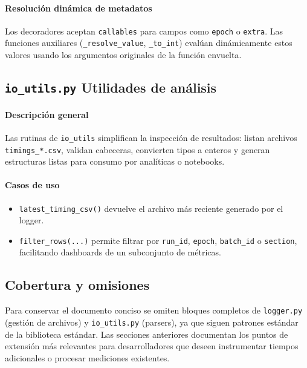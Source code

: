 \paragraph{Resolución dinámica de metadatos}
Los decoradores aceptan \texttt{callables} para campos como \texttt{epoch} o \texttt{extra}. Las funciones auxiliares (\texttt{\_resolve\_value}, \texttt{\_to\_int}) evalúan dinámicamente estos valores usando los argumentos originales de la función envuelta.

\subsection{\texttt{io\_utils.py} \- Utilidades de análisis}
\paragraph{Descripción general}
Las rutinas de \texttt{io\_utils} simplifican la inspección de resultados: listan archivos \texttt{timings\_*.csv}, validan cabeceras, convierten tipos a enteros y generan estructuras listas para consumo por analíticas o notebooks.

\paragraph{Casos de uso}
\begin{itemize}
    \item \texttt{latest\_timing\_csv()} devuelve el archivo más reciente generado por el logger.
    \item \texttt{filter\_rows(...)} permite filtrar por \texttt{run\_id}, \texttt{epoch}, \texttt{batch\_id} o \texttt{section}, facilitando dashboards de un subconjunto de métricas.
\end{itemize}

\subsection{Cobertura y omisiones}
Para conservar el documento conciso se omiten bloques completos de \texttt{logger.py} (gestión de archivos) y \texttt{io\_utils.py} (parsers), ya que siguen patrones estándar de la biblioteca estándar. Las secciones anteriores documentan los puntos de extensión más relevantes para desarrolladores que deseen instrumentar tiempos adicionales o procesar mediciones existentes.
